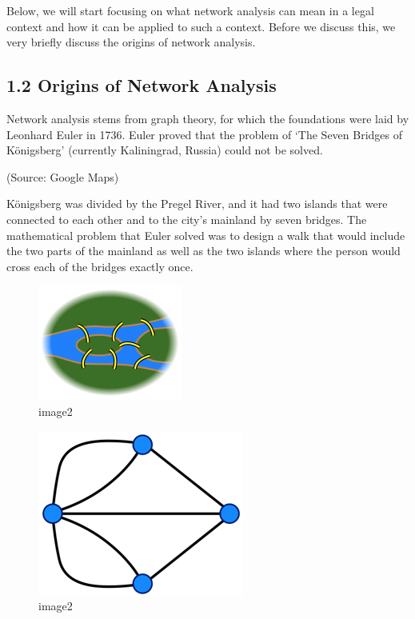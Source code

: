     Below, we will start focusing on what network analysis can mean in a
legal context and how it can be applied to such a context. Before we
discuss this, we very briefly discuss the origins of network analysis.

    \hypertarget{origins-of-network-analysis}{%
\subsection{1.2 Origins of Network
Analysis}\label{origins-of-network-analysis}}

Network analysis stems from graph theory, for which the foundations were
laid by Leonhard Euler in 1736. Euler proved that the problem of `The
Seven Bridges of Königsberg' (currently Kaliningrad, Russia) could not
be solved.

(Source: Google Maps)

Königsberg was divided by the Pregel River, and it had two islands that
were connected to each other and to the city's mainland by seven
bridges. The mathematical problem that Euler solved was to design a walk
that would include the two parts of the mainland as well as the two
islands where the person would cross each of the bridges exactly once.

\begin{figure}
\centering
\includegraphics{images/ch1/konisberg_bridges_2.png}
\caption{image2}
\end{figure}

\begin{figure}
\centering
\includegraphics{images/ch1/konisberg_bridges_3.png}
\caption{image2}
\end{figure}

